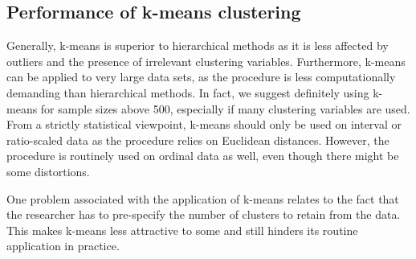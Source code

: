 \documentclass[a4paper,12pt]{article}
\begin{document}
\subsection{Performance of k-means clustering}
Generally, k-means is superior to hierarchical methods as it is less affected by
outliers and the presence of irrelevant clustering variables. Furthermore, k-means
can be applied to very large data sets, as the procedure is less computationally
demanding than hierarchical methods. In fact, we suggest definitely using k-means
for sample sizes above 500, especially if many clustering variables are used. From
a strictly statistical viewpoint, k-means should only be used on interval or ratio-scaled
data as the procedure relies on Euclidean distances. However, the procedure is
routinely used on ordinal data as well, even though there might be some distortions.

One problem associated with the application of k-means relates to the fact that
the researcher has to pre-specify the number of clusters to retain from the data. This
makes k-means less attractive to some and still hinders its routine application in
practice.
\end{document}
